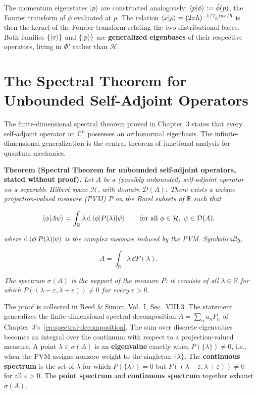 The momentum eigenstates $\ket{p}$ are constructed analogously: $\braket{p|\phi} := \tilde{\phi}(p)$, the Fourier transform of $\phi$ evaluated at $p$. The relation $\braket{x|p} = (2\pi\hbar)^{-1/2} e^{ipx/\hbar}$ is then the kernel of the Fourier transform relating the two distributional bases. Both families $\{\ket{x}\}$ and $\{\ket{p}\}$ are \textbf{generalized eigenbases} of their respective operators, living in $\Phi'$ rather than $\mathcal{H}$.

\section{The Spectral Theorem for Unbounded Self-Adjoint Operators}
\label{sec:appendix-spectral}

The finite-dimensional spectral theorem proved in Chapter~3 states that every self-adjoint operator on $\mathbb{C}^n$ possesses an orthonormal eigenbasis. The infinite-dimensional generalization is the central theorem of functional analysis for quantum mechanics.

\medskip\noindent\textbf{Theorem (Spectral Theorem for unbounded self-adjoint operators, stated without proof).} \emph{Let $A$ be a (possibly unbounded) self-adjoint operator on a separable Hilbert space $\mathcal{H}$, with domain $\mathcal{D}(A)$. There exists a unique projection-valued measure (PVM) $P$ on the Borel subsets of $\mathbb{R}$ such that}
\begin{linenomath}
    \begin{equation}
        \braket{\phi|A\psi} = \int_{\mathbb{R}} \lambda\,\mathrm{d}\braket{\phi|P(\lambda)|\psi}
        \qquad \text{for all } \phi \in \mathcal{H},\; \psi \in \mathcal{D}(A),
        \label{eq:spectral-theorem}
    \end{equation}
\end{linenomath}
\emph{where $\mathrm{d}\braket{\phi|P(\lambda)|\psi}$ is the complex measure induced by the PVM. Symbolically,}
\begin{linenomath}
    \begin{equation}
        A = \int_{\mathbb{R}} \lambda\,\dd P(\lambda).
        \label{eq:spectral-integral}
    \end{equation}
\end{linenomath}
\emph{The spectrum $\sigma(A)$ is the support of the measure $P$: it consists of all $\lambda \in \mathbb{R}$ for which $P((\lambda-\varepsilon, \lambda+\varepsilon)) \neq 0$ for every $\varepsilon > 0$.}

The proof is collected in Reed \& Simon, Vol.~I, Sec.~VIII.3. The statement generalizes the finite-dimensional spectral decomposition $A = \sum_n a_n P_n$ of Chapter~3's~\eqref{eq:spectral-decomposition}. The sum over discrete eigenvalues becomes an integral over the continuum with respect to a projection-valued measure. A point $\lambda \in \sigma(A)$ is an \textbf{eigenvalue} exactly when $P(\{\lambda\}) \neq 0$, i.e., when the PVM assigns nonzero weight to the singleton $\{\lambda\}$. The \textbf{continuous spectrum} is the set of $\lambda$ for which $P(\{\lambda\}) = 0$ but $P((\lambda-\varepsilon, \lambda+\varepsilon)) \neq 0$ for all $\varepsilon > 0$. The \textbf{point spectrum} and \textbf{continuous spectrum} together exhaust $\sigma(A)$.

